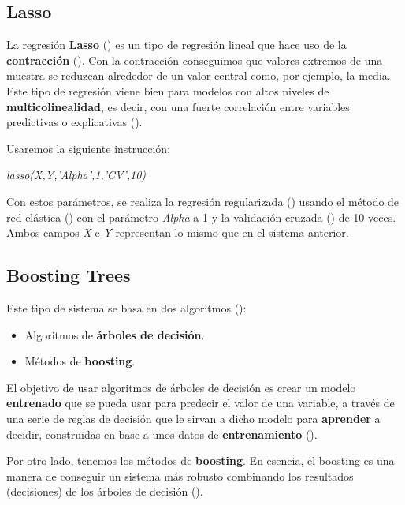 \subsection{Lasso}

La regresión \textbf{Lasso} (\cite{lasso}) es un tipo de regresión lineal que hace uso de la \textbf{contracción} (\cite{shrinkage}). Con la contracción conseguimos que valores extremos de una muestra se reduzcan alrededor de un valor central como, por ejemplo, la media. Este tipo de regresión viene bien para modelos con altos niveles de \textbf{multicolinealidad}, es decir, con una fuerte correlación entre variables predictivas o explicativas (\cite{multicollinearity}).

Usaremos la siguiente instrucción:

\begin{center}
\textit{lasso(X,Y,'Alpha',1,'CV',10)}
\end{center}

Con estos parámetros, se realiza la regresión regularizada (\cite{lasso-matlab}) usando el método de red elástica (\cite{elasticnet}) con el parámetro \textit{Alpha} a 1 y la validación cruzada (\cite{cv}) de 10 veces. Ambos campos \textit{X} e \textit{Y} representan lo mismo que en el sistema anterior.

\subsection{Boosting Trees}

Este tipo de sistema se basa en dos algoritmos (\cite{boosting-trees}):

\begin{itemize}
\item Algoritmos de \textbf{árboles de decisión}.
\item Métodos de \textbf{boosting}.
\end{itemize}

El objetivo de usar algoritmos de árboles de decisión es crear un modelo \textbf{entrenado} que se pueda usar para predecir el valor de una variable, a través de una serie de reglas de decisión que le sirvan a dicho modelo para \textbf{aprender} a decidir, construidas en base a unos datos de \textbf{entrenamiento} (\cite{decision-tree}).

Por otro lado, tenemos los métodos de \textbf{boosting}. En esencia, el boosting es una manera de conseguir un sistema más robusto combinando los resultados (decisiones) de los árboles de decisión (\cite{boosting}).

